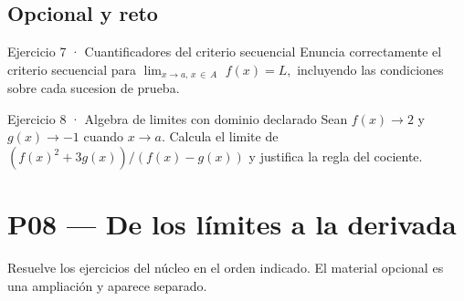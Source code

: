 \documentclass[10pt,a4paper,oneside,openany]{book}
\begin{document}
\section*{Opcional y reto}
\begin{PSevenOptionalFixed}{Ejercicio 7 · Cuantificadores del criterio secuencial}
Enuncia correctamente el criterio secuencial para \(\lim_{x\to a,\,x\,\in \,A}\) \(f(x)=L,\) incluyendo las condiciones sobre cada sucesion de prueba.
\end{PSevenOptionalFixed}
\begin{PSevenOptionalFixed}{Ejercicio 8 · Algebra de limites con dominio declarado}
Sean \(f(x)\to 2\) y \(g(x)\to -1\) cuando \(x\to a\). Calcula el limite de \((f(x)^{2}+3g(x))/(f(x)-g(x))\) y justifica la regla del cociente.
\end{PSevenOptionalFixed}
\chapter{P08 — De los límites a la derivada}
Resuelve los ejercicios del núcleo en el orden indicado. El material opcional es una ampliación y aparece separado.
\end{document}
